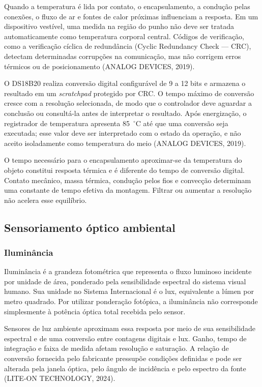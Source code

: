 \documentclass{article}
\begin{document}
Quando a temperatura \'e lida por contato, o encapsulamento, a condu\c{c}\~ao pelas conex\~oes, o fluxo de ar e fontes de calor pr\'oximas influenciam a resposta. Em um dispositivo vest\'ivel, uma medida na regi\~ao do punho n\~ao deve ser tratada automaticamente como temperatura corporal central. C\'odigos de verifica\c{c}\~ao, como a verifica\c{c}\~ao c\'iclica de redund\^ancia (Cyclic Redundancy Check --- CRC), detectam determinadas corrup\c{c}\~oes na comunica\c{c}\~ao, mas n\~ao corrigem erros t\'ermicos ou de posicionamento (ANALOG DEVICES, 2019).


O DS18B20 realiza convers\~ao digital configur\'avel de 9 a 12 bits e armazena o resultado em um \emph{scratchpad} protegido por CRC. O tempo m\'aximo de convers\~ao cresce com a resolu\c{c}\~ao selecionada, de modo que o controlador deve aguardar a conclus\~ao ou consult\'a-la antes de interpretar o resultado. Ap\'os energiza\c{c}\~ao, o registrador de temperatura apresenta 85~$^\circ$C at\'e que uma convers\~ao seja executada; esse valor deve ser interpretado com o estado da opera\c{c}\~ao, e n\~ao aceito isoladamente como temperatura do meio (ANALOG DEVICES, 2019).


O tempo necess\'ario para o encapsulamento aproximar-se da temperatura do objeto constitui resposta t\'ermica e \'e diferente do tempo de convers\~ao digital. Contato mec\^anico, massa t\'ermica, condu\c{c}\~ao pelos fios e convec\c{c}\~ao determinam uma constante de tempo efetiva da montagem. Filtrar ou aumentar a resolu\c{c}\~ao n\~ao acelera esse equil\'ibrio.


\subsection{Sensoriamento \'optico ambiental}


\subsubsection{Ilumin\^ancia}


Ilumin\^ancia \'e a grandeza fotom\'etrica que representa o fluxo luminoso incidente por unidade de \'area, ponderado pela sensibilidade espectral do sistema visual humano. Sua unidade no Sistema Internacional \'e o lux, equivalente a l\'umen por metro quadrado. Por utilizar pondera\c{c}\~ao fot\'opica, a ilumin\^ancia n\~ao corresponde simplesmente \`a pot\^encia \'optica total recebida pelo sensor.


Sensores de luz ambiente aproximam essa resposta por meio de sua sensibilidade espectral e de uma convers\~ao entre contagens digitais e lux. Ganho, tempo de integra\c{c}\~ao e faixa de medida afetam resolu\c{c}\~ao e satura\c{c}\~ao. A rela\c{c}\~ao de convers\~ao fornecida pelo fabricante pressup\~oe condi\c{c}\~oes definidas e pode ser alterada pela janela \'optica, pelo \^angulo de incid\^encia e pelo espectro da fonte (LITE-ON TECHNOLOGY, 2024).
\end{document}
